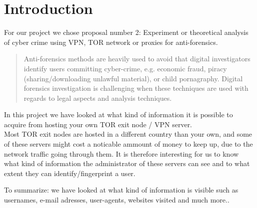 \section{Introduction}
For our project we chose proposal number 2: Experiment or theoretical analysis of cyber crime using VPN, TOR network or proxies for anti-forensics.

\begin{quote}
Anti-forensics methods are heavily used to avoid that digital investigators identify users committing cyber-crime, e.g. economic fraud, piracy (sharing/downloading unlawful material), or child pornagraphy. Digital forensics investigation is challenging when these techniques are used with regards to legal aspects and analysis techniques.
\end{quote}

In this project we have looked at what kind of information it is possible to acquire from hosting your own TOR exit node / VPN server. \\

Most TOR exit nodes are hosted in a different country than your own, and some of these servers might cost a noticable ammount of money to keep up, due to the network traffic going through them. It is therefore interesting for us to know what kind of information the administrator of these servers can see and to what extent they can identify/fingerprint a user.

To summarize:
we have looked at what kind of information is visible such as usernames, e-mail adresses, user-agents, websites visited and much more..
